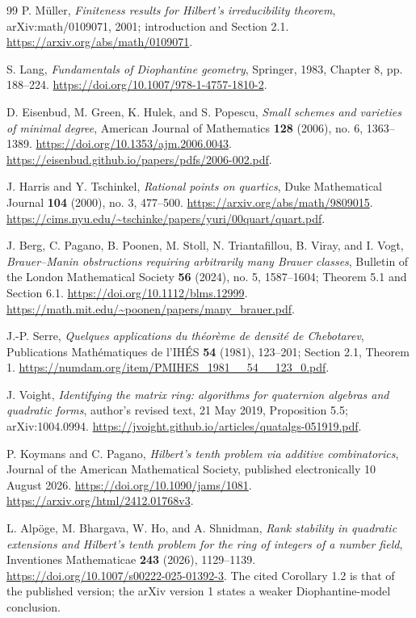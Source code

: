 \documentclass[11pt]{article}
\theoremstyle{definition}
\begin{document}
\begin{thebibliography}{99}
P. M\"uller, \emph{Finiteness results for Hilbert's irreducibility
theorem}, arXiv:math/0109071, 2001; introduction and Section 2.1.
\url{https://arxiv.org/abs/math/0109071}.

S. Lang, \emph{Fundamentals of Diophantine geometry}, Springer, 1983,
Chapter 8, pp. 188--224.
\url{https://doi.org/10.1007/978-1-4757-1810-2}.

D. Eisenbud, M. Green, K. Hulek, and S. Popescu,
\emph{Small schemes and varieties of minimal degree}, American Journal
of Mathematics \textbf{128} (2006), no. 6, 1363--1389.
\url{https://doi.org/10.1353/ajm.2006.0043}.
\url{https://eisenbud.github.io/papers/pdfs/2006-002.pdf}.

J. Harris and Y. Tschinkel, \emph{Rational points on quartics},
Duke Mathematical Journal \textbf{104} (2000), no. 3, 477--500.
\url{https://arxiv.org/abs/math/9809015}.
\url{https://cims.nyu.edu/~tschinke/papers/yuri/00quart/quart.pdf}.

J. Berg, C. Pagano, B. Poonen, M. Stoll, N. Triantafillou, B. Viray,
and I. Vogt, \emph{Brauer--Manin obstructions requiring arbitrarily many
Brauer classes}, Bulletin of the London Mathematical Society
\textbf{56} (2024), no. 5, 1587--1604; Theorem 5.1 and Section 6.1.
\url{https://doi.org/10.1112/blms.12999}.
\url{https://math.mit.edu/~poonen/papers/many_brauer.pdf}.

J.-P. Serre, \emph{Quelques applications du th\'eor\`eme de densit\'e
de Chebotarev}, Publications Math\'ematiques de l'IH\'ES \textbf{54}
(1981), 123--201; Section 2.1, Theorem 1.
\url{https://numdam.org/item/PMIHES_1981__54__123_0.pdf}.

J. Voight, \emph{Identifying the matrix ring: algorithms for quaternion
algebras and quadratic forms}, author's revised text, 21 May 2019,
Proposition 5.5; arXiv:1004.0994.
\url{https://jvoight.github.io/articles/quatalgs-051919.pdf}.

P. Koymans and C. Pagano, \emph{Hilbert's tenth problem via additive
combinatorics}, Journal of the American Mathematical Society,
published electronically 10 August 2026.
\url{https://doi.org/10.1090/jams/1081}.
\url{https://arxiv.org/html/2412.01768v3}.

L. Alp\"oge, M. Bhargava, W. Ho, and A. Shnidman,
\emph{Rank stability in quadratic extensions and Hilbert's tenth
problem for the ring of integers of a number field}, Inventiones
Mathematicae \textbf{243} (2026), 1129--1139.
\url{https://doi.org/10.1007/s00222-025-01392-3}.
The cited Corollary 1.2 is that of the published version; the arXiv
version 1 states a weaker Diophantine-model conclusion.


\end{thebibliography}
\end{document}
